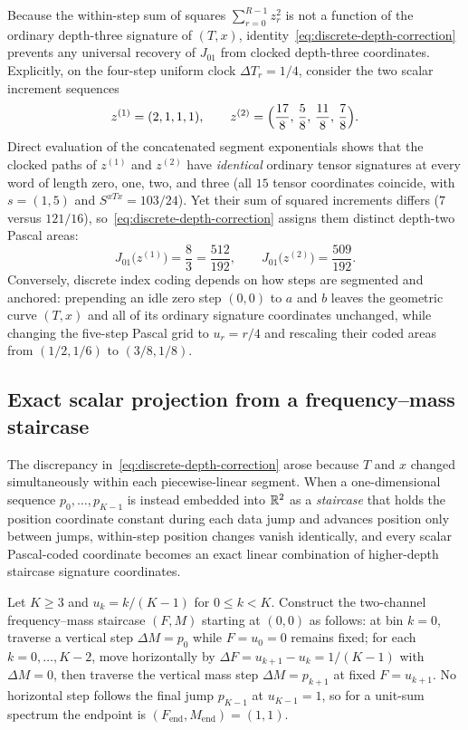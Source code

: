 \begin{example}
\label{ex:depth-three-collision}
Because the within-step sum of squares \(\sum_{r=0}^{R-1} z_r^2\) is not a
function of the ordinary depth-three signature of \((T, x)\),
identity~\eqref{eq:discrete-depth-correction} prevents any universal recovery of
\(J_{01}\) from clocked depth-three coordinates. Explicitly, on the
four-step uniform clock \(\Delta T_r = 1/4\), consider the two scalar increment
sequences
\[
 z^{(1)} = (2, 1, 1, 1), \qquad
 z^{(2)} = \Bigl(\frac{17}{8},\, \frac{5}{8},\, \frac{11}{8},\, \frac{7}{8}\Bigr).
\]
Direct evaluation of the concatenated segment exponentials shows that the clocked
paths of \(z^{(1)}\) and \(z^{(2)}\) have \emph{identical} ordinary tensor
signatures at every word of length zero, one, two, and three (all \(15\) tensor
coordinates coincide, with \(s = (1, 5)\) and \(S^{xTx} = 103/24\)). Yet their sum
of squared increments differs (\(7\) versus \(121/16\)), so~\eqref{eq:discrete-depth-correction}
assigns them distinct depth-two Pascal areas:
\[
 J_{01}\bigl(z^{(1)}\bigr) = \frac{8}{3} = \frac{512}{192}, \qquad
 J_{01}\bigl(z^{(2)}\bigr) = \frac{509}{192}.
\]
Conversely, discrete index coding depends on how steps are segmented and
anchored: prepending an idle zero step \((0, 0)\) to \(a\) and \(b\) leaves the
geometric curve \((T, x)\) and all of its ordinary signature coordinates
unchanged, while changing the five-step Pascal grid to \(u_r = r/4\) and
rescaling their coded areas from \((1/2, 1/6)\) to \((3/8, 1/8)\).
\end{example}

\subsection{Exact scalar projection from a frequency--mass staircase}
\label{app:staircase-projection}
The discrepancy in~\eqref{eq:discrete-depth-correction} arose because \(T\) and
\(x\) changed simultaneously within each piecewise-linear segment. When a
one-dimensional sequence \(p_0, \ldots, p_{K-1}\) is instead embedded into \(\mathbb{R}^2\)
as a \emph{staircase} that holds the position coordinate constant during each
data jump and advances position only between jumps, within-step position changes
vanish identically, and every scalar Pascal-coded coordinate becomes an exact
linear combination of higher-depth staircase signature coordinates.

Let \(K \geq 3\) and \(u_k = k/(K-1)\) for \(0 \leq k < K\). Construct the
two-channel frequency--mass staircase \((F, M)\) starting at \((0, 0)\) as
follows: at bin \(k = 0\), traverse a vertical step \(\Delta M = p_0\) while
\(F = u_0 = 0\) remains fixed; for each \(k = 0, \ldots, K-2\), move horizontally
by \(\Delta F = u_{k+1} - u_k = 1/(K-1)\) with \(\Delta M = 0\), then traverse
the vertical mass step \(\Delta M = p_{k+1}\) at fixed \(F = u_{k+1}\). No
horizontal step follows the final jump \(p_{K-1}\) at \(u_{K-1} = 1\), so for a
unit-sum spectrum the endpoint is \((F_{\mathrm{end}}, M_{\mathrm{end}}) = (1, 1)\).

